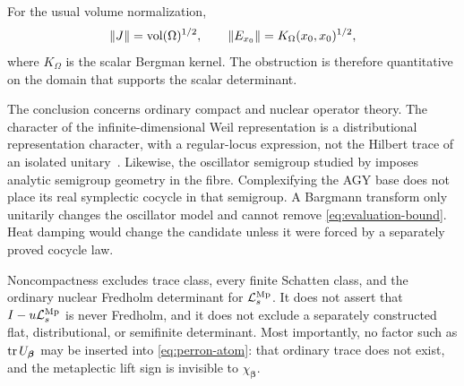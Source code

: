 For the usual volume normalization,
\[
 \|J\|=\operatorname{vol}(\Omega)^{1/2},
 \qquad
 \|E_{x_0}\|=K_\Omega(x_0,x_0)^{1/2},
\]
where \(K_\Omega\) is the scalar Bergman kernel.  The obstruction is
therefore quantitative on the domain that supports the scalar determinant.

The conclusion concerns ordinary compact and nuclear operator theory.
The character of the infinite-dimensional Weil representation is a
distributional representation character, with a regular-locus expression,
not the Hilbert trace of an isolated unitary~\citep{thomas2008}.  Likewise,
the oscillator semigroup studied by \citet{hilgert1989} imposes analytic
semigroup geometry in the fibre.  Complexifying the AGY base does not place
its real symplectic cocycle in that semigroup.  A Bargmann transform only
unitarily changes the oscillator model and cannot remove
\eqref{eq:evaluation-bound}.  Heat damping would change the candidate unless
it were forced by a separately proved cocycle law.

Noncompactness excludes trace class, every finite Schatten class, and the
ordinary nuclear Fredholm determinant for \(\mathcal{L}_s^{\rm Mp}\).  It does not
assert that \(I-u\mathcal{L}_s^{\rm Mp}\) is never Fredholm, and it does not exclude
a separately constructed flat, distributional, or semifinite determinant.
Most importantly, no factor such as \(\operatorname{tr} U_{\boldsymbol\beta}\) may be
inserted into \eqref{eq:perron-atom}: that ordinary trace does not exist, and
the metaplectic lift sign is invisible to \(\chi_{\boldsymbol\beta}\).
